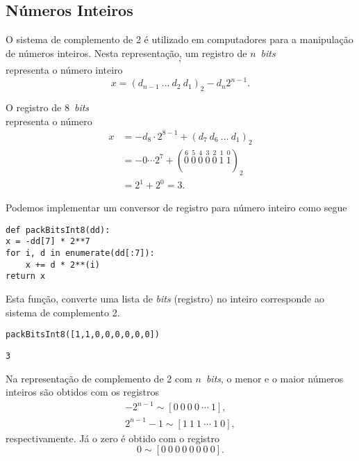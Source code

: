 \subsection{Números Inteiros}

O sistema de complemento de 2 é utilizado em computadores para a manipulação de números inteiros. Nesta representação, um registro de $n$~{\it bits}
\begin{equation}
  [d_1 ~ d_2 ~ d_3 ~ \cdots ~ d_n],
\end{equation}
representa o número inteiro
\begin{equation}
  x = (d_{n-1}~\ldots~d_2~d_1)_2 - d_n2^{n-1}.
\end{equation}

\begin{ex}
  O registro de 8~{\it bits}
  \begin{equation}
    [1 ~ 1 ~ 0 ~ 0 ~ 0 ~ 0 ~ 0 ~ 0]
  \end{equation}
  representa o número
  \begin{align}
    x &= -d_8\cdot 2^{8-1} + (d_7~d_6~\ldots~d_1)_2\\
      &= -0\cdots 2^{7} + (\stackrel{6}{0}~\stackrel{5}{0}~\stackrel{4}{0}~\stackrel{3}{0}~\stackrel{2}{0}~\stackrel{1}{1}~\stackrel{0}{1})_2\\
      &= 2^1 + 2^0 = 3.
  \end{align}
  
  Podemos implementar um conversor de registro para número inteiro como segue

\begin{lstlisting}[caption=packbits8.py, label=cod:packbits8]
def packBitsInt8(dd):
x = -dd[7] * 2**7
for i, d in enumerate(dd[:7]):
    x += d * 2**(i)
return x
\end{lstlisting}

Esta função, converte uma lista de {\it bits} (registro) no inteiro corresponde ao sistema de complemento 2.

\begin{lstlisting}
packBitsInt8([1,1,0,0,0,0,0,0])
\end{lstlisting}

\begin{verbatim}
3
\end{verbatim}
\end{ex}

Na representação de complemento de 2 com $n$~{\it bits}, o menor e o maior números inteiros são obtidos com os registros
\begin{gather}
  -2^{n-1} \sim [0 ~ 0 ~ 0 ~ 0 ~ \cdots ~ 1],\\
  2^{n-1}-1 \sim [1 ~ 1 ~ 1 ~ \cdots ~ 1 ~ 0],
\end{gather}
respectivamente. Já o zero é obtido com o registro
\begin{equation}
  0 \sim [0 ~ 0 ~ 0 ~ 0 ~ 0 ~ 0 ~ 0 ~ 0].
\end{equation}

